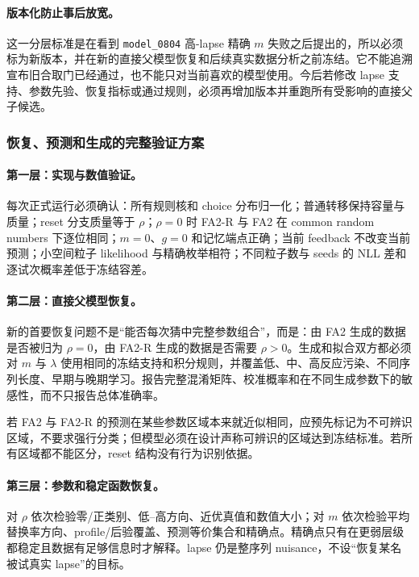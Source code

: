 \paragraph{版本化防止事后放宽。}
这一分层标准是在看到 \texttt{model\_0804} 高-lapse 精确 $m$ 失败之后提出的，所以必须标为新版本，并在新的直接父模型恢复和后续真实数据分析之前冻结。它不能追溯宣布旧合取门已经通过，也不能只对当前喜欢的模型使用。今后若修改 lapse 支持、参数先验、恢复指标或通过规则，必须再增加版本并重跑所有受影响的直接父子候选。


\subsubsection{恢复、预测和生成的完整验证方案}

\paragraph{第一层：实现与数值验证。}
每次正式运行必须确认：所有规则核和 choice 分布归一化；普通转移保持容量与质量；reset 分支质量等于 $\rho$；$\rho=0$ 时 FA2-R 与 FA2 在 common random numbers 下逐位相同；$m=0$、$g=0$ 和记忆端点正确；当前 feedback 不改变当前预测；小空间粒子 likelihood 与精确枚举相符；不同粒子数与 seeds 的 NLL 差和逐试次概率差低于冻结容差。

\paragraph{第二层：直接父模型恢复。}
新的首要恢复问题不是“能否每次猜中完整参数组合”，而是：由 FA2 生成的数据是否被归为 $\rho=0$，由 FA2-R 生成的数据是否需要 $\rho>0$。生成和拟合双方都必须对 $m$ 与 $\lambda$ 使用相同的冻结支持和积分规则，并覆盖低、中、高反应污染、不同序列长度、早期与晚期学习。报告完整混淆矩阵、校准概率和在不同生成参数下的敏感性，而不只报告总体准确率。

若 FA2 与 FA2-R 的预测在某些参数区域本来就近似相同，应预先标记为不可辨识区域，不要求强行分类；但模型必须在设计声称可辨识的区域达到冻结标准。若所有区域都不能区分，reset 结构没有行为识别依据。

\paragraph{第三层：参数和稳定函数恢复。}
对 $\rho$ 依次检验零/正类别、低--高方向、近优真值和数值大小；对 $m$ 依次检验平均替换率方向、profile/后验覆盖、预测等价集合和精确点。精确点只有在更弱层级都稳定且数据有足够信息时才解释。lapse 仍是整序列 nuisance，不设“恢复某名被试真实 lapse”的目标。

